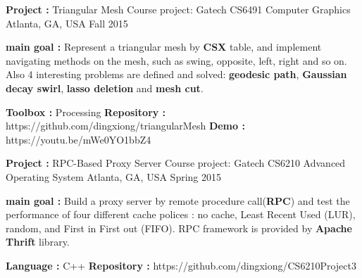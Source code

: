


\begin{cventries}


\cventry
{\textbf{Project :} Triangular Mesh} 
{Course project: Gatech CS6491 Computer Graphics} 
{Atlanta, GA, USA} %
{Fall 2015} %
{
  \begin{cvitems}
  \item {\textbf{main goal :} Represent a triangular mesh by \textbf{CSX} table, and implement navigating
      methods on the mesh, such as swing, opposite, left, right and so on. Also 4 interesting problems
      are defined and solved: \textbf{geodesic path}, 
      \textbf{Gaussian decay swirl}, \textbf{lasso deletion} and \textbf{mesh cut}.}
  \item {\textbf{Toolbox :} Processing \quad
      \textbf{Repository :} {\color{red} https://github.com/dingxiong/triangularMesh}
      \quad
      \textbf{Demo : }  {\color{red} https://youtu.be/mWe0YO1bbZ4}}
  \end{cvitems}
}

\cventry
{\textbf{Project :} RPC-Based Proxy Server} 
{Course project: Gatech CS6210 Advanced Operating System} 
{Atlanta, GA, USA} %
{Spring 2015} %
{
  \begin{cvitems}
  \item {\textbf{main goal :} Build a proxy server by remote procedure call(\textbf{RPC}) and test
      the performance of four different cache polices : no cache, Least Recent Used (LUR), random,
      and First in First out (FIFO). RPC framework is provided by \textbf{Apache Thrift} library.
    }
  \item {\textbf{Language :} C++  \quad
      \textbf{Repository :} {\color{red} https://github.com/dingxiong/CS6210Project3}
    }
  \end{cvitems}
}


\end{cventries}
